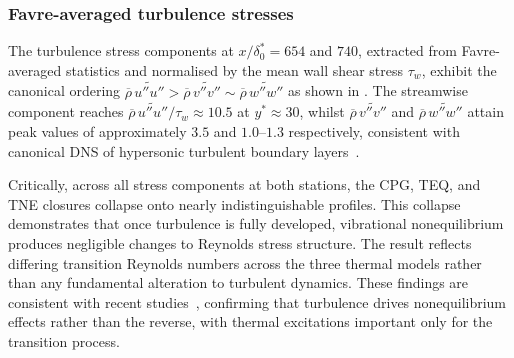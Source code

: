 \subsubsection{Favre-averaged turbulence stresses}

The turbulence stress components at $x/\delta^*_0 = 654$ and $740$, extracted from Favre-averaged statistics and normalised by the mean wall shear stress $\tau_w$, exhibit the canonical ordering $\overline{\rho}\,\widetilde{u''u''} > \overline{\rho}\,\widetilde{v''v''} \sim \overline{\rho}\,\widetilde{w''w''}$ as shown in . The streamwise component reaches $\overline{\rho}\,\widetilde{u''u''}/\tau_w \approx 10.5$ at $y^* \approx 30$, whilst $\overline{\rho}\,\widetilde{v''v''}$ and $\overline{\rho}\,\widetilde{w''w''}$ attain peak values of approximately $3.5$ and $1.0$--$1.3$ respectively, consistent with canonical DNS of hypersonic turbulent boundary layers~\citep{ZhangDuanChoudhari2018,XuEtal2021}.

Critically, across all stress components at both stations, the \gls{CPG}, \gls{TEQ}, and \gls{TNE} closures collapse onto nearly indistinguishable profiles. This collapse demonstrates that once turbulence is fully developed, vibrational nonequilibrium produces negligible changes to Reynolds stress structure. The result reflects differing transition Reynolds numbers across the three thermal models rather than any fundamental alteration to turbulent dynamics. These findings are consistent with recent studies~\citep{DiRenzo2021,Williamsetal2025}, confirming that turbulence drives nonequilibrium effects rather than the reverse, with thermal excitations important only for the transition process.



